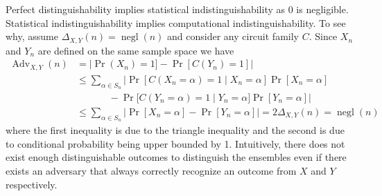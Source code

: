 Perfect distinguishability implies statistical indistinguishability as 0 is negligible. Statistical indistinguishability implies computational indistinguishability. To see why, assume $\Delta_{X,Y}(n) = \operatorname{negl}(n)$ and consider any circuit family $C$. Since $X_n$ and $Y_n$ are defined on the same sample space we have
\begin{equation*}
\begin{aligned}
    \operatorname{Adv}_{X,Y}(n) &= |\operatorname{Pr}(X_n) = 1] - \operatorname{Pr}[C(Y_n) = 1]|\\
        &\leq \sum_{\alpha \in S_n} | \operatorname{Pr}[C(X_n = \alpha) = 1 \; | \; X_n = \alpha]\operatorname{Pr}[X_n = \alpha] \\
        &\phantom{=} \qquad - \operatorname{Pr}[C(Y_n = \alpha) = 1 \; | \; Y_n = \alpha]\operatorname{Pr}[Y_n = \alpha] | \\
        &\leq \sum_{\alpha \in S_n} | \operatorname{Pr}[X_n = \alpha] - \operatorname{Pr}[Y_n = \alpha]| = 2\Delta_{X,Y}(n) = \operatorname{negl}(n)
\end{aligned}
\end{equation*}
where the first inequality is due to the triangle inequality and the second is due to conditional probability being upper bounded by 1. Intuitively, there does not exist enough distinguishable outcomes to distinguish the ensembles even if there exists an adversary that always correctly recognize an outcome from $X$ and $Y$ respectively.

